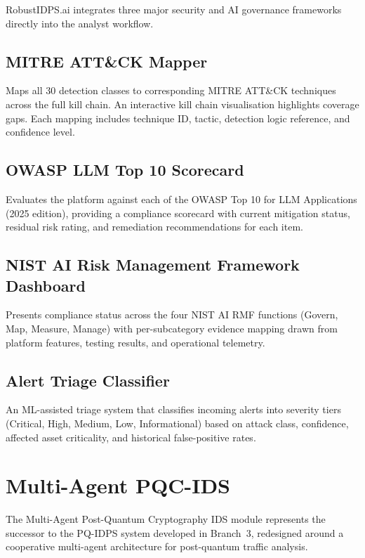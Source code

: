 \documentclass[11pt,a4paper]{article}
\begin{document}
RobustIDPS.ai integrates three major security and AI governance frameworks
directly into the analyst workflow.

\subsection{MITRE ATT\&CK Mapper}
Maps all 30 detection classes to corresponding MITRE ATT\&CK techniques
across the full kill chain.  An interactive kill chain visualisation
highlights coverage gaps.  Each mapping includes technique ID, tactic,
detection logic reference, and confidence level.

\subsection{OWASP LLM Top 10 Scorecard}
Evaluates the platform against each of the OWASP Top 10 for LLM Applications
(2025 edition), providing a compliance scorecard with current mitigation
status, residual risk rating, and remediation recommendations for each item.

\subsection{NIST AI Risk Management Framework Dashboard}
Presents compliance status across the four NIST AI RMF functions (Govern,
Map, Measure, Manage) with per-subcategory evidence mapping drawn from
platform features, testing results, and operational telemetry.

\subsection{Alert Triage Classifier}
An ML-assisted triage system that classifies incoming alerts into severity
tiers (Critical, High, Medium, Low, Informational) based on attack class,
confidence, affected asset criticality, and historical false-positive rates.

\section{Multi-Agent PQC-IDS}
\label{sec:pqc_ids}

The Multi-Agent Post-Quantum Cryptography IDS module represents the
successor to the PQ-IDPS system developed in Branch~3, redesigned around
a cooperative multi-agent architecture for post-quantum traffic analysis.
\end{document}
